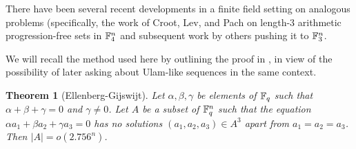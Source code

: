 \documentclass{article}
\newtheorem{theorem}{Theorem}[section]
\theoremstyle{definition}
\theoremstyle{remark}
\numberwithin{equation}{section}
\begin{document}
There have been several recent developments in a finite field setting
on analogous problems (specifically, the work of Croot, Lev, and Pach
\cite{progressions_croot} on length-3 arithmetic progression-free sets
in $\mathbb{F}_4^n$ and subsequent work by others \cite{capset_ellenberg}
pushing it to $\mathbb{F}_3^n$.

We will recall the method used here by outlining the proof in
\cite{capset_ellenberg}, in view of the possibility of later asking
about Ulam-like sequences in the same context.

\begin{theorem}[Ellenberg-Gijswijt]
Let $\alpha, \beta, \gamma$ be elements of $\mathbb{F}_q$ such that
$\alpha+\beta+\gamma = 0$ and $\gamma \neq 0$.  Let $A$ be a subset of
$\mathbb{F}_q^n$ such that the equation $\alpha a_1 + \beta a_2 + \gamma a_3
= 0$ has no solutions $(a_1, a_2, a_3) \in A^3$ apart from $a_1 = a_2
= a_3$.  Then $|A| = o(2.756^n)$.
\end{theorem}
\end{document}
